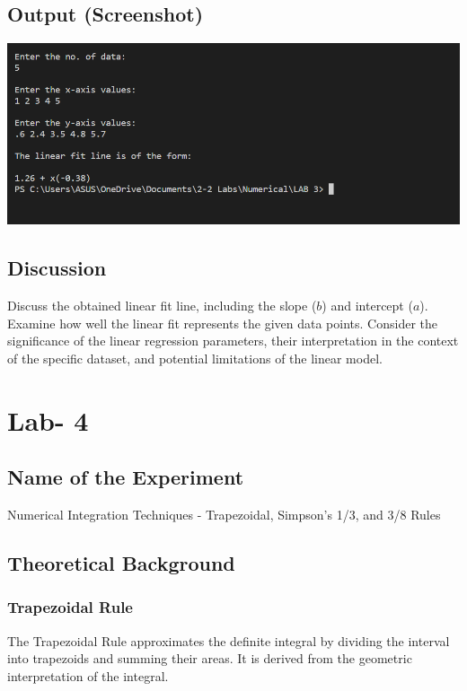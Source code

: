 \documentclass{article}
\begin{document}
\subsection*{Output (Screenshot)}
\includegraphics[width=\textwidth]{lab3.png}

\subsection*{Discussion}
Discuss the obtained linear fit line, including the slope ($b$) and intercept ($a$). Examine how well the linear fit represents the given data points. Consider the significance of the linear regression parameters, their interpretation in the context of the specific dataset, and potential limitations of the linear model.

\clearpage

\section*{\centering Lab- 4}

\subsection*{Name of the Experiment}
Numerical Integration Techniques - Trapezoidal, Simpson's 1/3, and 3/8 Rules

\subsection*{Theoretical Background}

\subsubsection*{Trapezoidal Rule}
The Trapezoidal Rule approximates the definite integral by dividing the interval into trapezoids and summing their areas. It is derived from the geometric interpretation of the integral.
\end{document}
